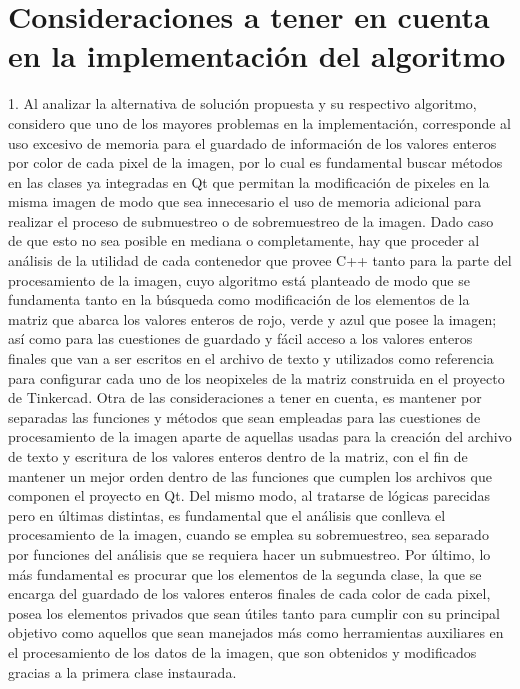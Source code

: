 \documentclass{article}
\begin{document}
\section{Consideraciones a tener en cuenta en la implementación del algoritmo} \label{contenido}
1.  Al analizar la alternativa de solución propuesta y su respectivo algoritmo, considero que uno de los mayores problemas en la implementación, corresponde al uso excesivo de memoria para el guardado de información de los valores enteros por color de cada pixel de la imagen, por lo cual es fundamental buscar métodos en las clases ya integradas en Qt que permitan la modificación de pixeles en la misma imagen de modo que sea innecesario el uso de memoria adicional para realizar el proceso de submuestreo o de sobremuestreo de la imagen. Dado caso de que esto no sea posible en mediana o completamente, hay que proceder al análisis de la utilidad de cada contenedor que provee C++ tanto para la parte del procesamiento de la imagen, cuyo algoritmo está planteado de modo que se fundamenta tanto en la búsqueda como modificación de los elementos de la matriz que abarca los valores enteros de rojo, verde y azul que posee la imagen; así como para las cuestiones de guardado y fácil acceso a los valores enteros finales que van a ser escritos en el archivo de texto y utilizados como referencia para configurar cada uno de los neopixeles de la matriz construida en el proyecto de Tinkercad. Otra de las consideraciones a tener en cuenta, es mantener por separadas las funciones y métodos que sean empleadas para las cuestiones de procesamiento de la imagen aparte de aquellas usadas para la creación del archivo de texto y escritura de los valores enteros dentro de la matriz, con el fin de mantener un mejor orden dentro de las funciones que cumplen los archivos que componen el proyecto en Qt. Del mismo modo, al tratarse de lógicas parecidas pero en últimas distintas, es fundamental que el análisis que conlleva el procesamiento de la imagen, cuando se emplea su sobremuestreo, sea separado por funciones del análisis que se requiera hacer un submuestreo. Por último, lo más fundamental es procurar que los elementos de la segunda clase, la que se encarga del guardado de los valores enteros finales de cada color de cada pixel, posea los elementos privados que sean útiles tanto para cumplir con su principal objetivo como aquellos que sean manejados más como herramientas auxiliares en el procesamiento de los datos de la imagen, que son obtenidos y modificados gracias a la primera clase instaurada.
\newline




\end{document}

